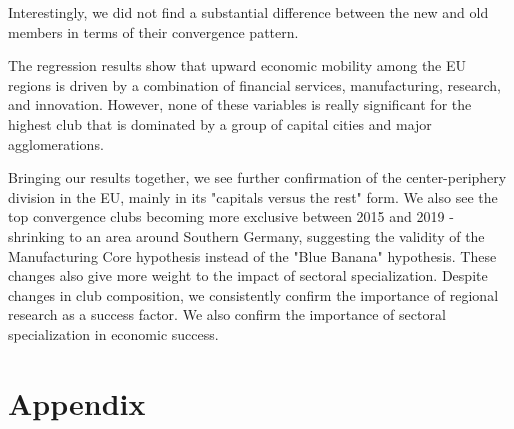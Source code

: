 \documentclass[11pt]{article}
\begin{document}
Interestingly, we did not find a substantial difference between the new and old members in terms of their convergence pattern.


The regression results show that upward economic mobility among the EU regions is driven by a combination of financial services, manufacturing, research, and innovation. However, none of these variables is really significant for the highest club that is dominated by a group of capital cities and major agglomerations.
 
 
Bringing our results together, we see further confirmation of the center-periphery division in the EU, mainly in its "capitals versus the rest" form. We also see the top convergence clubs becoming more exclusive between 2015 and 2019 - shrinking to an area around Southern Germany, suggesting the validity of the Manufacturing Core hypothesis instead of the "Blue Banana" hypothesis. These changes also give more weight to the impact of sectoral specialization. Despite changes in club composition, we consistently confirm the importance of regional research as a success factor. We also confirm the importance of sectoral specialization in economic success.



\newpage



\section{Appendix}
\end{document}
